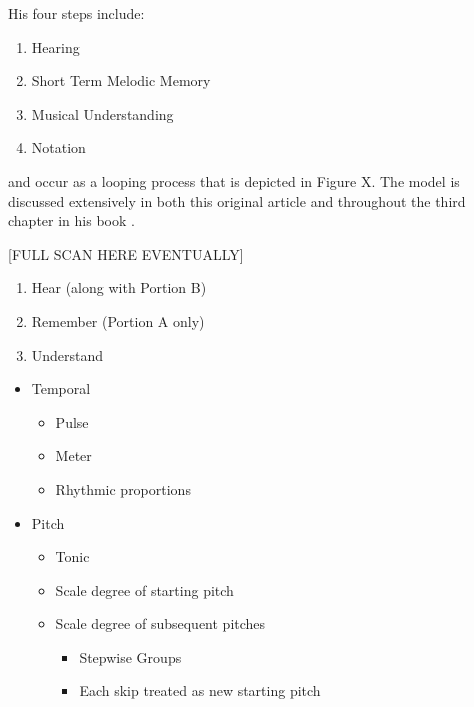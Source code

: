 \documentclass[]{book}
\providecommand{\tightlist}{%
  \setlength{\itemsep}{0pt}\setlength{\parskip}{0pt}}
\theoremstyle{definition}
\theoremstyle{definition}
\theoremstyle{definition}
\theoremstyle{remark}
\begin{document}
His four steps include:

\begin{enumerate}
\def\labelenumi{\arabic{enumi}.}
\tightlist
\item
  Hearing
\item
  Short Term Melodic Memory
\item
  Musical Understanding
\item
  Notation
\end{enumerate}

and occur as a looping process that is depicted in Figure X. The model
is discussed extensively in both this original article
\citep{karpinskiModelMusicPerception1990} and throughout the third
chapter in his book \citep{karpinskiAuralSkillsAcquisition2000}.

{[}FULL SCAN HERE EVENTUALLY{]}

\begin{enumerate}
\def\labelenumi{\arabic{enumi}.}
\tightlist
\item
  Hear (along with Portion B)
\item
  Remember (Portion A only)
\item
  Understand
\end{enumerate}

\begin{itemize}
\tightlist
\item
  Temporal

  \begin{itemize}
  \tightlist
  \item
    Pulse
  \item
    Meter
  \item
    Rhythmic proportions
  \end{itemize}
\item
  Pitch

  \begin{itemize}
  \tightlist
  \item
    Tonic
  \item
    Scale degree of starting pitch
  \item
    Scale degree of subsequent pitches

    \begin{itemize}
    \tightlist
    \item
      Stepwise Groups
    \item
      Each skip treated as new starting pitch
    \end{itemize}
  \end{itemize}
\end{itemize}
\end{document}
